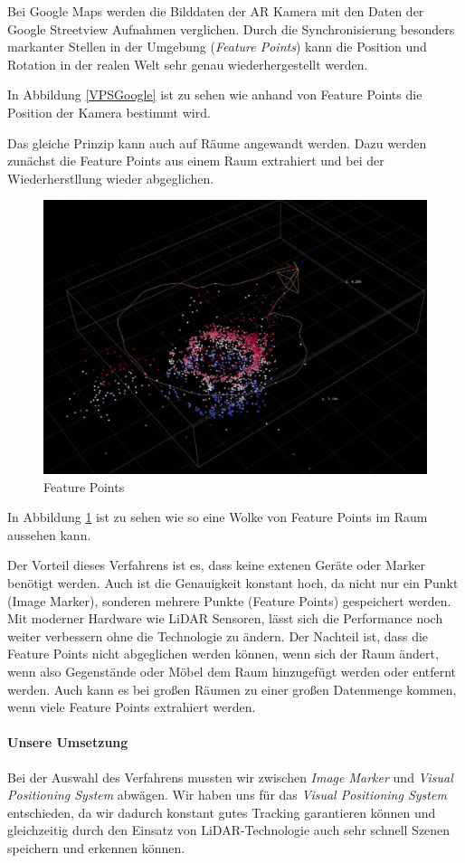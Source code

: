 \documentclass[titlepage, a4paper, 11pt]{scrartcl}
\begin{document}
    Bei Google Maps werden die Bilddaten der AR Kamera mit den Daten der Google Streetview Aufnahmen verglichen.
    Durch die Synchronisierung besonders markanter Stellen in der Umgebung (\textit{Feature Points}) kann die Position und Rotation in der realen Welt sehr genau wiederhergestellt werden.

    In Abbildung \ref{VPSGoogle} ist zu sehen wie anhand von Feature Points die Position der Kamera bestimmt wird.

    Das gleiche Prinzip kann auch auf Räume angewandt werden. Dazu werden zunächst die Feature Points aus einem Raum extrahiert und bei der Wiederherstllung wieder abgeglichen.

    \begin{figure}[h]
      \centering
      \includegraphics[width=.5\textwidth]{arworldmap-featurepoints}
      \caption{Feature Points}
      \label{FeaturePoints}
    \end{figure}

    In Abbildung \ref{FeaturePoints} ist zu sehen wie so eine Wolke von Feature Points im Raum aussehen kann.

    Der Vorteil dieses Verfahrens ist es, dass keine extenen Geräte oder Marker benötigt werden. Auch ist die Genauigkeit konstant hoch, da nicht nur ein Punkt (Image Marker), sonderen mehrere Punkte (Feature Points) gespeichert werden. Mit moderner Hardware wie LiDAR Sensoren, lässt sich die Performance noch weiter verbessern ohne die Technologie zu ändern.
    Der Nachteil ist, dass die Feature Points nicht abgeglichen werden können, wenn sich der Raum ändert, wenn also Gegenstände oder Möbel dem Raum hinzugefügt werden oder entfernt werden.
    Auch kann es bei großen Räumen zu einer großen Datenmenge kommen, wenn viele Feature Points extrahiert werden.

    \paragraph{Unsere Umsetzung}

    Bei der Auswahl des Verfahrens mussten wir zwischen \textit{Image Marker} und \textit{Visual Positioning System} abwägen.
    Wir haben uns für das \textit{Visual Positioning System} entschieden, da wir dadurch konstant gutes Tracking garantieren können und
    gleichzeitig durch den Einsatz von LiDAR-Technologie auch sehr schnell Szenen speichern und erkennen können.
\end{document}

